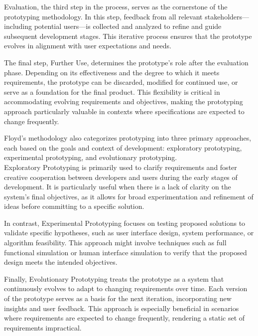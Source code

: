Evaluation, the third step in the process, serves as the cornerstone of the prototyping methodology. In this step,
feedback from all relevant stakeholders—including potential users—is collected and analyzed to refine and guide
subsequent development stages. This iterative process ensures that the prototype evolves in alignment with user
expectations and needs.\autocite[cf.][p.4-5]{floydSystematicLookPrototyping1984}

The final step, Further Use, determines the prototype's role after the evaluation phase. Depending on its effectiveness
and the degree to which it meets requirements, the prototype can be discarded, modified for continued use, or serve as a
foundation for the final product. This flexibility is critical in accommodating evolving requirements and objectives,
making the prototyping approach particularly valuable in contexts where specifications are expected to change
frequently.\autocite[cf.][p.5]{floydSystematicLookPrototyping1984}

Floyd’s methodology also categorizes prototyping into three primary approaches, each based on the goals and context of
development: exploratory prototyping, experimental prototyping, and evolutionary prototyping.
\autocite[cf.][p.6]{floydSystematicLookPrototyping1984}\\ Exploratory Prototyping is
primarily used to clarify requirements and foster creative cooperation between developers and users during the early
stages of development. It is particularly useful when there is a lack of clarity on the system’s final objectives, as it
allows for broad experimentation and refinement of ideas before committing to a specific solution.
\autocite[cf.][p.6-7]{floydSystematicLookPrototyping1984}

In contrast, Experimental Prototyping focuses on testing proposed solutions to validate specific hypotheses, such as
user interface design, system performance, or algorithm feasibility. This approach might involve techniques such as full
functional simulation or human interface simulation to verify that the proposed design meets the intended objectives.
\autocite[cf.][p.8-10]{floydSystematicLookPrototyping1984}

Finally, Evolutionary Prototyping treats the prototype as a system that continuously evolves to adapt to changing
requirements over time. Each version of the prototype serves as a basis for the next iteration, incorporating new
insights and user feedback. This approach is especially beneficial in scenarios where requirements are expected to
change frequently, rendering a static set of requirements impractical.
\autocite[cf.][p.10-12]{floydSystematicLookPrototyping1984}

